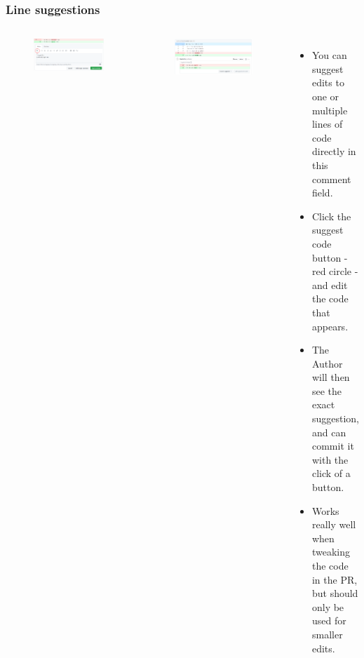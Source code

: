 \documentclass[aspectratio=169]{beamer}
\begin{document}
\begin{frame}
	\frametitle{Line suggestions}
	\begin{columns}[c]

		\vspace{-.6cm}
		\begin{figure}
			\centering
			\includegraphics[width=\textwidth]{./img/suggestion-1.png}
		\end{figure}
		\vspace{-.3cm}
		\begin{figure}
			\centering
			\includegraphics[width=\textwidth]{./img/suggestion-2.png}
		\end{figure}

		\begin{itemize}
			\setlength\itemsep{.74em}
			\item You can suggest edits to one or multiple lines of code 
			directly in this comment field.
			
			\item Click the suggest code button - red circle - 
			and edit the code that appears.
			
			\item The Author will then see the exact suggestion, 
			and can commit it with the click of a button.
			
			\item Works really well when tweaking the code in the PR,
			but should only be used for smaller edits.
		\end{itemize}

	\end{columns}
\end{frame}
\end{document}
